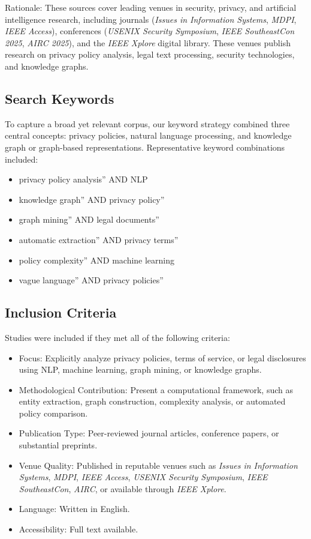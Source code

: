 \documentclass[conference]{IEEEtran}
\begin{document}
Rationale: These sources cover leading venues in security, privacy, and artificial intelligence research, including journals (\textit{Issues in Information Systems}, \textit{MDPI}, \textit{IEEE Access}), conferences (\textit{USENIX Security Symposium}, \textit{IEEE SoutheastCon 2025}, \textit{AIRC 2025}), and the \textit{IEEE Xplore} digital library. These venues publish research on privacy policy analysis, legal text processing, security technologies, and knowledge graphs.


\subsection{Search Keywords}
To capture a broad yet relevant corpus, our keyword strategy combined three central concepts: privacy policies, natural language processing, and knowledge graph or graph-based representations. Representative keyword combinations included:
\begin{itemize}
\item privacy policy analysis'' AND NLP     \item knowledge graph'' AND privacy policy''     \item graph mining'' AND legal documents''     \item automatic extraction'' AND privacy terms''     \item policy complexity'' AND machine learning
\item vague language'' AND privacy policies''
\end{itemize}
\subsection{Inclusion Criteria}
Studies were included if they met all of the following criteria:
\begin{itemize}
\item Focus: Explicitly analyze privacy policies, terms of service, or legal disclosures using NLP, machine learning, graph mining, or knowledge graphs.
\item Methodological Contribution: Present a computational framework, such as entity extraction, graph construction, complexity analysis, or automated policy comparison.
\item Publication Type: Peer-reviewed journal articles, conference papers, or substantial preprints.
\item Venue Quality: Published in reputable venues such as \textit{Issues in Information Systems}, \textit{MDPI}, \textit{IEEE Access}, \textit{USENIX Security Symposium}, \textit{IEEE SoutheastCon}, \textit{AIRC}, or available through \textit{IEEE Xplore}.
\item Language: Written in English.
\item Accessibility: Full text available.
\end{itemize}
\end{document}
